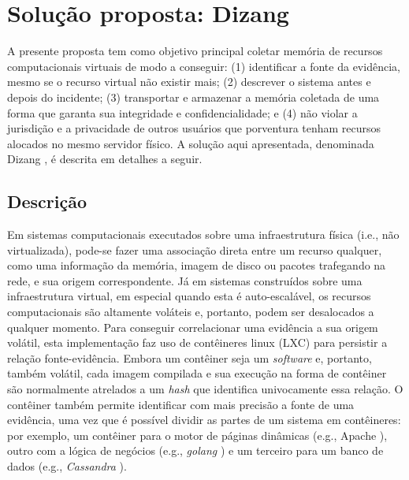 \documentclass[conference]{IEEEtran}
\newcommand{\fancyname}{Dizang }
\begin{document}
\section{Solução proposta: \fancyname}
\label{sec:proposal}

A presente proposta tem como objetivo principal coletar memória de recursos computacionais virtuais de modo a conseguir: 
(1) identificar a fonte da evidência, mesmo se o recurso virtual não existir mais; 
(2) descrever o sistema antes e depois do incidente;
(3) transportar e armazenar a memória coletada de uma forma que garanta sua integridade e confidencialidade; e
(4) não violar a jurisdição e a privacidade de outros usuários que porventura tenham recursos alocados no mesmo servidor físico.
%
A solução aqui apresentada, denominada \fancyname, é descrita em detalhes a seguir.


\subsection{Descrição}
\label{sec:proposal-desc}

Em sistemas computacionais executados sobre uma infraestrutura física (i.e., não virtualizada), pode-se fazer uma associação direta entre um recurso qualquer, como uma informação da memória, imagem de disco ou pacotes trafegando na rede, e sua origem correspondente.
%
Já em sistemas construídos sobre uma infraestrutura virtual, em especial quando esta é auto-escalável, os recursos computacionais são altamente voláteis e, portanto, podem ser desalocados a qualquer momento.
%
Para conseguir correlacionar uma evidência a sua origem volátil, esta implementação faz uso de contêineres linux (LXC) para persistir a relação fonte-evidência.
%
Embora um contêiner seja um \textit{software} e, portanto, também volátil, cada imagem compilada e sua execução na forma de contêiner são normalmente atrelados a um \textit{hash} que identifica univocamente essa relação.
%
O contêiner também permite identificar com mais precisão a fonte de uma evidência, uma vez que é possível dividir as partes de um sistema em contêineres: por exemplo, um contêiner para o motor de páginas dinâmicas (e.g., Apache%
), outro com a lógica de negócios (e.g., \textit{golang}%
) e um terceiro para um banco de dados (e.g., \textit{Cassandra}%
).
\end{document}
